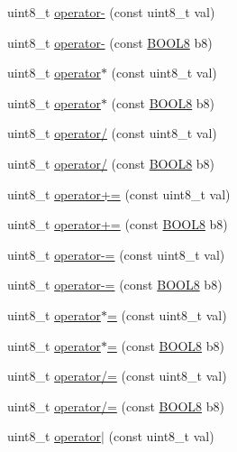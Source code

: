 \begin{DoxyCompactItemize}
uint8\+\_\+t \hyperlink{struct_b_o_o_l8_a2540f7471db3bd3c85853b917a7068fd}{operator-\/} (const uint8\+\_\+t val)
\item 
uint8\+\_\+t \hyperlink{struct_b_o_o_l8_abdda05d69009981fd146b5a8d266832a}{operator-\/} (const \hyperlink{struct_b_o_o_l8}{B\+O\+O\+L8} b8)
\item 
uint8\+\_\+t \hyperlink{struct_b_o_o_l8_a556d8bc5696eb10ca874450f39cc9d68}{operator$\ast$} (const uint8\+\_\+t val)
\item 
uint8\+\_\+t \hyperlink{struct_b_o_o_l8_a2003637ede278ccb57884ccec54f88dc}{operator$\ast$} (const \hyperlink{struct_b_o_o_l8}{B\+O\+O\+L8} b8)
\item 
uint8\+\_\+t \hyperlink{struct_b_o_o_l8_a10e18bcb3b312d506817ffc60765ba6b}{operator/} (const uint8\+\_\+t val)
\item 
uint8\+\_\+t \hyperlink{struct_b_o_o_l8_a89f1bf36c915e91e5201ef357ee845d7}{operator/} (const \hyperlink{struct_b_o_o_l8}{B\+O\+O\+L8} b8)
\item 
uint8\+\_\+t \hyperlink{struct_b_o_o_l8_a5ba6ac7b2a2fbb9afe3f43968b9de74c}{operator+=} (const uint8\+\_\+t val)
\item 
uint8\+\_\+t \hyperlink{struct_b_o_o_l8_a76a432f140c208e34d54a3ea950e3f69}{operator+=} (const \hyperlink{struct_b_o_o_l8}{B\+O\+O\+L8} b8)
\item 
uint8\+\_\+t \hyperlink{struct_b_o_o_l8_a32a5e5741398f2552a7f95ea0804e519}{operator-\/=} (const uint8\+\_\+t val)
\item 
uint8\+\_\+t \hyperlink{struct_b_o_o_l8_aa9b8ccd944e3c23788cd017337d1f444}{operator-\/=} (const \hyperlink{struct_b_o_o_l8}{B\+O\+O\+L8} b8)
\item 
uint8\+\_\+t \hyperlink{struct_b_o_o_l8_ab3f40d0f3d8df20a843eee81af6646da}{operator$\ast$=} (const uint8\+\_\+t val)
\item 
uint8\+\_\+t \hyperlink{struct_b_o_o_l8_abf1644ec601cbaa5b1a8768cb389c909}{operator$\ast$=} (const \hyperlink{struct_b_o_o_l8}{B\+O\+O\+L8} b8)
\item 
uint8\+\_\+t \hyperlink{struct_b_o_o_l8_a09b75917ca736a613d80bbec1b290ad1}{operator/=} (const uint8\+\_\+t val)
\item 
uint8\+\_\+t \hyperlink{struct_b_o_o_l8_a0a8baa1ccf80887c5fc90002b3412878}{operator/=} (const \hyperlink{struct_b_o_o_l8}{B\+O\+O\+L8} b8)
\item 
uint8\+\_\+t \hyperlink{struct_b_o_o_l8_a61dc40e130cc220178775071cd37a0bc}{operator$\vert$} (const uint8\+\_\+t val)
\item 

\end{DoxyCompactItemize}
